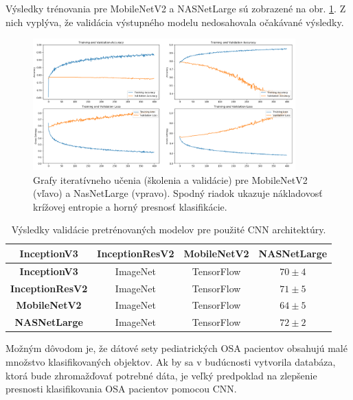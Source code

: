 Výsledky trénovania pre MobileNetV2 a NASNetLarge sú zobrazené na obr. \ref{fig:resers:d}. Z nich vyplýva, že validácia výstupného modelu nedosahovala očakávané výsledky. 


\begin{figure}[h]
	\centering
	\includegraphics[width=0.9\textwidth]{figures/resers_d.png}
	\caption{Grafy iteratívneho učenia (školenia a validácie) pre MobileNetV2 (vľavo) a NasNetLarge (vpravo). Spodný riadok ukazuje nákladovosť krížovej entropie a horný presnosť klasifikácie.}
	\label{fig:resers:d}
\end{figure}


\begin{table}[H]
	\caption{\label{tab:resers:1} Výsledky validácie pretrénovaných modelov pre použité CNN architektúry. }
	\centering
	\begin{tabular}{cccc}
		\toprule
		\textbf{InceptionV3} & \textbf{InceptionResV2} & \textbf{MobileNetV2} & \textbf{NASNetLarge}     \\ 
		\midrule
		\textbf{InceptionV3}           & ImageNet     	& TensorFlow    & $70 \pm 4$		\\ 
		\textbf{InceptionResV2}        & ImageNet		& TensorFlow  	& $71 \pm 5$		\\ 
		\textbf{MobileNetV2}           & ImageNet     	& TensorFlow    & $64 \pm 5$		\\ 
		\textbf{NASNetLarge}           & ImageNet     	& TensorFlow    & $72 \pm 2$		\\ 
		\bottomrule
	\end{tabular}
\end{table}

Možným dôvodom je, že dátové sety pediatrických OSA pacientov obsahujú malé množstvo klasifikovaných objektov. Ak by sa v budúcnosti vytvorila databáza, ktorá bude zhromažďovať potrebné dáta, je veľký predpoklad na zlepšenie presnosti klasifikovania OSA pacientov pomocou CNN.


